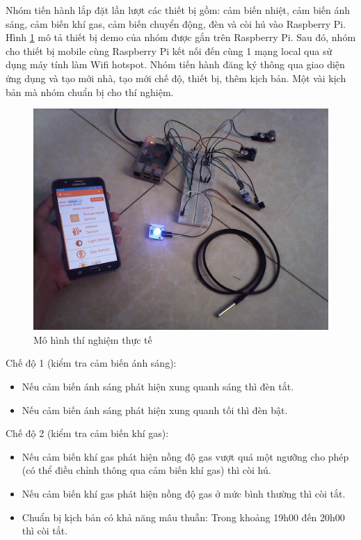 \documentclass[12pt,a4paper,oneside]{extbook}
\begin{document}
Nhóm tiến hành lắp đặt lần lượt các thiết bị gồm: cảm biến nhiệt, cảm biến ánh sáng, cảm biến khí gas, cảm biến chuyển động, đèn và còi hú vào Raspberry Pi. Hình \ref{fig:7-real-system} mô tả thiết bị demo của nhóm được gắn trên Raspberry Pi. Sau đó, nhóm cho thiết bị mobile cùng Raspberry Pi kết nối đến cùng 1 mạng local qua sử dụng máy tính làm Wifi hotspot. Nhóm tiến hành đăng ký thông qua giao diện ứng dụng và tạo mới nhà, tạo mới chế độ, thiết bị, thêm kịch bản. Một vài kịch bản mà nhóm chuẩn bị cho thí nghiệm.

\begin{figure}[h]
  \centering
     \includegraphics[width=15cm]{7-real-system}
  \caption{Mô hình thí nghiệm thực tế}\label{fig:7-real-system}
\end{figure}

\noindent
Chế độ 1 (kiểm tra cảm biến ánh sáng):

\begin{itemize}[topsep=1mm,itemsep=-0.5mm]
\item Nếu cảm biến ánh sáng phát hiện xung quanh sáng thì đèn tắt.
\item Nếu cảm biến ánh sáng phát hiện xung quanh tối thì đèn bật.
\vspace{1mm}
\end{itemize}

\noindent
Chế độ 2 (kiểm tra cảm biến khí gas):

\begin{itemize}[topsep=1mm,itemsep=-0.5mm]
\item Nếu cảm biến khí gas phát hiện nồng độ gas vượt quá một ngưỡng cho phép (có thể điều chỉnh thông qua cảm biến khí gas) thì còi hú.
\item Nếu cảm biến khí gas phát hiện nồng độ gas ở mức bình thường thì còi tắt.
\item Chuẩn bị kịch bản có khả năng mâu thuẫn: Trong khoảng 19h00 đến 20h00 thì còi tắt.
\vspace{1mm}
\end{itemize}
\end{document}
